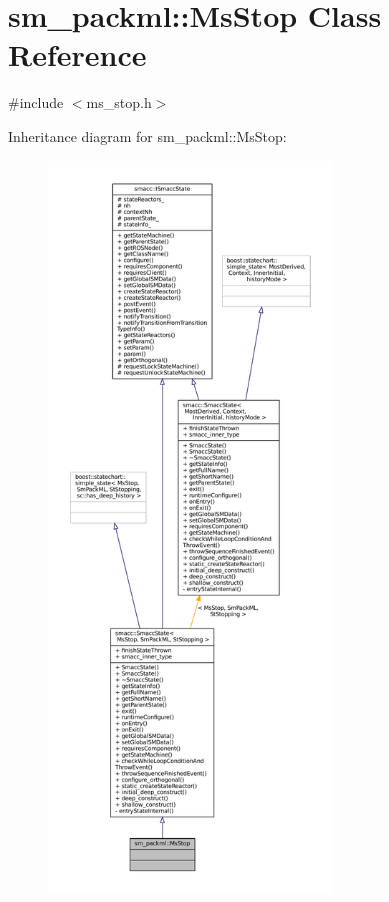 \hypertarget{classsm__packml_1_1MsStop}{}\section{sm\+\_\+packml\+:\+:Ms\+Stop Class Reference}
\label{classsm__packml_1_1MsStop}


{\ttfamily \#include $<$ms\+\_\+stop.\+h$>$}



Inheritance diagram for sm\+\_\+packml\+:\+:Ms\+Stop\+:
\nopagebreak
\begin{figure}[H]
\begin{center}
\leavevmode
\includegraphics[height=550pt]{classsm__packml_1_1MsStop__inherit__graph}
\end{center}
\end{figure}


